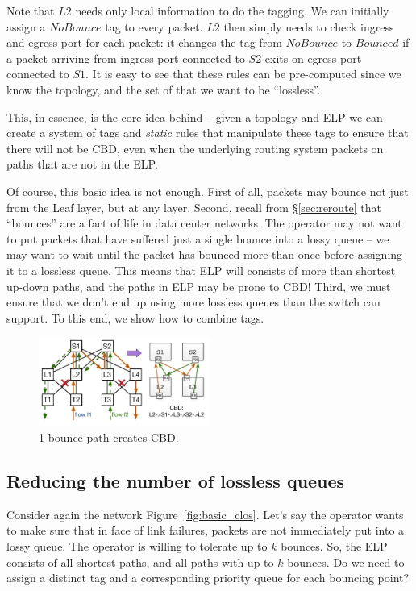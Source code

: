 Note that $L2$ needs only local information to do the tagging. We can initially
assign a $NoBounce$ tag to every packet. $L2$ then simply needs to check ingress
and egress port for each packet: it changes the tag from $NoBounce$ to $Bounced$
if a packet arriving from ingress port connected to $S2$ exits on egress port
connected to $S1$.  It is easy to see that these rules can be pre-computed since
we know the topology, and the set of  that we want to be ``lossless''.

This, in essence, is the core idea behind \sysname{} -- given a topology and ELP
we can create a system of tags and {\em static} rules that manipulate these tags
to ensure that there will not be CBD, even when the underlying routing system
 packets on paths that are not in the ELP.

Of course, this basic idea is not enough. First of all, packets may bounce not
just from the Leaf layer, but at any layer. Second, recall from
\S\ref{sec:reroute} that ``bounces'' are a fact of life in data center networks.
The operator may not want to put packets that have suffered just a single bounce
into a lossy queue -- we may want to wait until the packet has bounced more than
once before assigning it to a lossless queue. This means that ELP will consists
of more than shortest up-down paths, and the paths in ELP may be prone to CBD!
Third, we must ensure that we
don't end up using more lossless queues than the switch can support. To this
end, we show how to combine tags.

\begin{figure}[t]
	\centering
	\includegraphics[width=0.5\textwidth] {figs/cbd_a}
	\caption{1-bounce path creates CBD.}
	\label{fig:clos_1_bounce}
\end{figure}

\subsection{Reducing the number of lossless queues}
\label{subsec:combine}

Consider again the network Figure~\ref{fig:basic_clos}.  Let's say the operator
wants to make sure that in face of link failures, packets are not immediately
put into a lossy queue. The operator is willing to tolerate up to $k$ bounces.
So, the ELP consists of all shortest paths, and all paths with up to $k$ bounces.
Do we need to assign a distinct tag and a corresponding priority queue for each
bouncing point?

